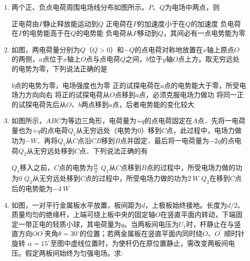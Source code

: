 \begin{enumerate}[leftmargin=0em]
\item
{}
两个正、负点电荷周围电场线分布如图所示。$ P $、$ Q $为电场中两点，则  
\begin{figure}[h!]
\centering

\end{figure}


\fourchoices
{正电荷由$ P $静止释放能运动到$ Q $}
{正电荷在$ P $的加速度小于在$ Q $的加速度}
{负电荷在$ P $的电势能高于在$ Q $的电势能}
{负电荷从$ P $移动到$ Q $，其间必有一点电势能为零}




\item
{}
如图，两电荷量分别为$ Q $（$ Q > 0 $）和$ -Q $的点电荷对称地放置在$ x $轴上原点$ O $的两侧，$ a $点位于$ x $轴上$ O $点与点电荷$ Q $之间，$ b $位于$ y $轴$ O $点上方。取无穷远处的电势为零，下列说法正确的是  
\begin{figure}[h!]
\centering

\end{figure}

\fourchoices
{$ b $点的电势为零，电场强度也为零}
{正的试探电荷在$ a $点的电势能大于零，所受电场力方向向右}
{将正的试探电荷从$ O $点移到$ a $点，必须克服电场力做功}
{将同一正的试探电荷先后从$ O $、$ b $两点移到$ a $点，后者电势能的变化较大}





\item
{}
如图所示，$ ABC $为等边三角形，电荷量为$ +q $的点电荷固定在$ A $点．先将一电荷量也为$ +q $的点电荷$ Q_{1} $从无穷远处（电势为$ 0 $）移到$ C $点，此过程中，电场力做功为$ -W $．再将$ Q_{1} $从$ C $点沿$ CB $移到$ B $点并固定．最后将一电荷量为$ -2q $的点电荷$ Q_{2} $从无穷远处移到$ C $点．下列说法正确的有  
\begin{figure}[h!]
\centering

\end{figure}



\fourchoices
{$ Q_{1} $移入之前，$ C $点的电势为$ \frac{W}{q} $}
{$ Q_{1} $从$ C $点移到$ B $点的过程中，所受电场力做的功为$ 0 $}
{$ Q_{2} $从无穷远处移到$ C $点的过程中，所受电场力做的功为$ 2 \ W $}
{$ Q_{2} $在移到$ C $点后的电势能为$ -4 \ W $}



\newpage 
\item
{}
如图，一对平行金属板水平放置，板间距为$ d $，上极板始终接地。长度为$ d/2 $、质量均匀的绝缘杆，上端可绕上板中央的固定轴$ O $在竖直平面内转动，下端固定一带正电的轻质小球，其电荷量为$ q $。当两板间电压为$ U_{1} $时，杆静止在与竖直方向$ OO ^{\prime} $夹角$ \theta =30 ^{\circ} $的位置；若两金属板在竖直平面内同时绕$ O $、$ O ^{\prime} $ 顺时针旋转 $ \alpha= 15 ^{\circ} $至图中虚线位置时，为使杆仍在原位置静止，需改变两板间电压。假定两板间始终为匀强电场。求$ : $
\begin{enumerate}
\renewcommand{\labelenumii}{(\arabic{enumii})}


\end{enumerate}
\end{enumerate}
